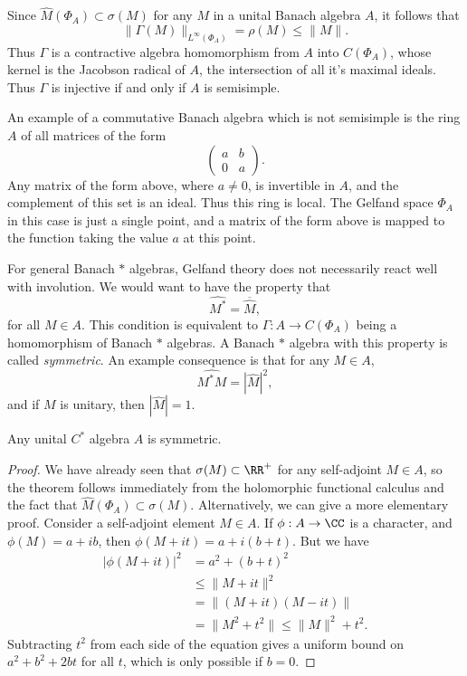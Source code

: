 Since $\widehat{M}(\Phi_A) \subset \sigma(M)$ for any $M$ in a unital Banach algebra $A$, it follows that
%
\[ \| \Gamma(M) \|_{L^\infty(\Phi_A)} = \rho(M) \leq \| M \|. \]
%
Thus $\Gamma$ is a contractive algebra homomorphism from $A$ into $C(\Phi_A)$, whose kernel is the Jacobson radical of $A$, the intersection of all it's maximal ideals. Thus $\Gamma$ is injective if and only if $A$ is semisimple.

\begin{example}
    An example of a commutative Banach algebra which is not semisimple is the ring $A$ of all matrices of the form
    \[ \begin{pmatrix} a & b \\ 0 & a \end{pmatrix}. \]
    Any matrix of the form above, where $a \neq 0$, is invertible in $A$, and the complement of this set is an ideal. Thus this ring is local. The Gelfand space $\Phi_A$ in this case is just a single point, and a matrix of the form above is mapped to the function taking the value $a$ at this point.
\end{example}

For general Banach $*$ algebras, Gelfand theory does not necessarily react well with involution. We would want to have the property that
%
\[ \widehat{M^*} = \overline{\widehat{M}}, \]
%
for all $M \in A$. This condition is equivalent to $\Gamma: A \to C(\Phi_A)$ being a homomorphism of Banach $*$ algebras. A Banach $*$ algebra with this property is called \emph{symmetric}. An example consequence is that for any $M \in A$,
%
\[ \widehat{M^* M} = |\widehat{M}|^2, \]
%
and if $M$ is unitary, then $|\widehat{M}| = 1$.

\begin{lemma}
    Any unital $C^*$ algebra $A$ is symmetric.
\end{lemma}
\begin{proof}
    We have already seen that $\sigma(M) \subset \RR^+$ for any self-adjoint $M \in A$, so the theorem follows immediately from the holomorphic functional calculus and the fact that $\widehat{M}(\Phi_A) \subset \sigma(M)$. Alternatively, we can give a more elementary proof. Consider a self-adjoint element $M \in A$. If $\phi: A \to \CC$ is a character, and $\phi(M) = a + i b$, then $\phi(M + i t) = a + i(b + t)$. But we have
    \begin{align*}
        |\phi(M + i t)|^2 &= a^2 + (b + t)^2\\
        &\leq \| M + it \|^2\\
        &= \| (M + it)(M - it) \|\\
        &= \| M^2 + t^2 \| \leq \| M \|^2 + t^2.
    \end{align*}
    Subtracting $t^2$ from each side of the equation gives a uniform bound on $a^2 + b^2 + 2bt$ for all $t$, which is only possible if $b = 0$.
\end{proof}

